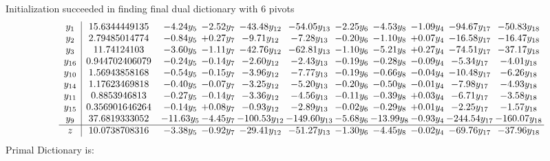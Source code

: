 \documentclass[9pt]{article}
\begin{document}
Initialization succeeded in finding final dual dictionary with 6 pivots
\[\begin{array}{c| c c@{\hskip 2pt} c@{\hskip 2pt} c@{\hskip 2pt} c@{\hskip 2pt} c@{\hskip 2pt} c@{\hskip 2pt} c@{\hskip 2pt} c@{\hskip 2pt} c@{\hskip 2pt} }
 y_{1}   &  15.6344449135 & -4.24 y_{5} & -2.52 y_{7} & -43.48 y_{12} & -54.05 y_{13} & -2.25 y_{6} & -4.53 y_{8} & -1.09 y_{4} & -94.67 y_{17} & -50.83 y_{18}\\
 y_{2}   &  2.79485014774 & -0.84 y_{5} & +  0.27 y_{7} & -9.71 y_{12} & -7.28 y_{13} & -0.20 y_{6} & -1.10 y_{8} & +  0.07 y_{4} & -16.58 y_{17} & -16.47 y_{18}\\
 y_{3}   &  11.74124103 & -3.60 y_{5} & -1.11 y_{7} & -42.76 y_{12} & -62.81 y_{13} & -1.10 y_{6} & -5.21 y_{8} & +  0.27 y_{4} & -74.51 y_{17} & -37.17 y_{18}\\
 y_{16}   &  0.944702406079 & -0.24 y_{5} & -0.14 y_{7} & -2.60 y_{12} & -2.43 y_{13} & -0.19 y_{6} & -0.28 y_{8} & -0.09 y_{4} & -5.34 y_{17} & -4.01 y_{18}\\
 y_{10}   &  1.56943858168 & -0.54 y_{5} & -0.15 y_{7} & -3.96 y_{12} & -7.77 y_{13} & -0.19 y_{6} & -0.66 y_{8} & -0.04 y_{4} & -10.48 y_{17} & -6.26 y_{18}\\
 y_{14}   &  1.17623469818 & -0.40 y_{5} & -0.07 y_{7} & -3.25 y_{12} & -5.20 y_{13} & -0.20 y_{6} & -0.50 y_{8} & -0.01 y_{4} & -7.98 y_{17} & -4.93 y_{18}\\
 y_{11}   &  0.8853946813 & -0.27 y_{5} & -0.14 y_{7} & -3.36 y_{12} & -4.56 y_{13} & -0.11 y_{6} & -0.39 y_{8} & +  0.03 y_{4} & -6.71 y_{17} & -3.58 y_{18}\\
 y_{15}   &  0.356901646264 & -0.14 y_{5} & +  0.08 y_{7} & -0.93 y_{12} & -2.89 y_{13} & -0.02 y_{6} & -0.29 y_{8} & +  0.01 y_{4} & -2.25 y_{17} & -1.57 y_{18}\\
 y_{9}   &  37.6819333052 & -11.63 y_{5} & -4.45 y_{7} & -100.53 y_{12} & -149.60 y_{13} & -5.68 y_{6} & -13.99 y_{8} & -0.93 y_{4} & -244.54 y_{17} & -160.07 y_{18}\\
\hline
z    &  10.0738708316 & -3.38 y_{5} & -0.92 y_{7} & -29.41 y_{12} & -51.27 y_{13} & -1.30 y_{6} & -4.45 y_{8} & -0.02 y_{4} & -69.76 y_{17} & -37.96 y_{18}\\
\end{array}\]
Primal Dictionary is:
\end{document}

